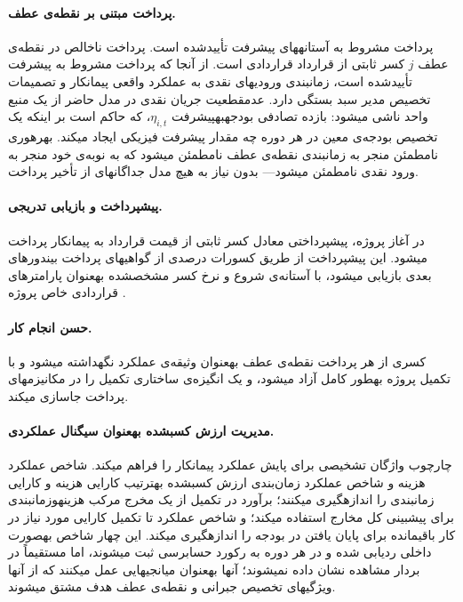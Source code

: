 \paragraph{پرداخت مبتنی بر نقطه‌ی عطف.}
پرداخت مشروط به آستانه\zwnj{}های پیشرفت تأییدشده است.
پرداخت ناخالص در نقطه‌ی عطف $j$ کسر ثابتی از
قرارداد قراردادی است.
از آنجا که پرداخت مشروط به پیشرفت تأییدشده است،
زمان\zwnj{}بندی ورودی\zwnj{}های نقدی به عملکرد واقعی پیمانکار و
تصمیمات تخصیص مدیر سبد بستگی دارد.
عدم\zwnj{}قطعیت جریان نقدی در مدل حاضر از یک منبع واحد ناشی می\zwnj{}شود:
بازده تصادفی بودجه\zwnj{}به\zwnj{}پیشرفت $\eta_{i,t}$،
که حاکم است بر اینکه یک تخصیص بودجه‌ی معین در هر دوره
چه مقدار پیشرفت فیزیکی ایجاد می\zwnj{}کند.
بهره\zwnj{}وری نامطمئن منجر به زمان\zwnj{}بندی نقطه‌ی عطف نامطمئن می\zwnj{}شود
که به نوبه‌ی خود منجر به ورود نقدی نامطمئن می\zwnj{}شود---
بدون نیاز به هیچ مدل جداگانه\zwnj{}ای از تأخیر پرداخت.

\paragraph{پیش\zwnj{}پرداخت و بازیابی تدریجی.}
در آغاز پروژه، پیش\zwnj{}پرداختی معادل کسر ثابتی از قیمت قرارداد
به پیمانکار پرداخت می\zwnj{}شود.
این پیش\zwnj{}پرداخت از طریق کسورات درصدی از گواهی\zwnj{}های پرداخت
بین\zwnj{}دوره\zwnj{}ای بعدی بازیابی می\zwnj{}شود،
با آستانه‌ی شروع و نرخ کسر مشخص\zwnj{}شده به\zwnj{}عنوان
پارامترهای قراردادی خاص پروژه \citep{FIDIC2017}.

\paragraph{حسن انجام کار.}
کسری از هر پرداخت نقطه‌ی عطف به\zwnj{}عنوان وثیقه‌ی عملکرد
نگه\zwnj{}داشته می\zwnj{}شود و با تکمیل پروژه به\zwnj{}طور کامل آزاد می\zwnj{}شود،
و یک انگیزه‌ی ساختاری تکمیل را در مکانیزم\zwnj{}های پرداخت جاسازی می\zwnj{}کند.

\paragraph{مدیریت ارزش کسب\zwnj{}شده به\zwnj{}عنوان سیگنال عملکردی.}
چارچوب  \citep{Fleming2010} واژگان تشخیصی برای
پایش عملکرد پیمانکار را فراهم می\zwnj{}کند.
شاخص عملکرد هزینه و شاخص عملکرد زمان‌بندی ارزش کسب\zwnj{}شده به\zwnj{}ترتیب
کارایی هزینه و کارایی زمان\zwnj{}بندی را اندازه\zwnj{}گیری می\zwnj{}کنند؛
برآورد در تکمیل از یک مخرج مرکب هزینه\zwnj{}و\zwnj{}زمان\zwnj{}بندی
برای پیش\zwnj{}بینی کل مخارج استفاده می\zwnj{}کند؛
و شاخص عملکرد تا تکمیل کارایی مورد نیاز در کار باقی\zwnj{}مانده
برای پایان یافتن در بودجه را اندازه\zwnj{}گیری می\zwnj{}کند.
این چهار شاخص به\zwnj{}صورت داخلی ردیابی شده و در هر دوره
به رکورد حسابرسی ثبت می\zwnj{}شوند، اما مستقیماً در بردار مشاهده
نشان داده نمی\zwnj{}شوند؛ آن\zwnj{}ها به\zwnj{}عنوان میانجی\zwnj{}هایی عمل می\zwnj{}کنند
که از آن\zwnj{}ها ویژگی\zwnj{}های تخصیص جبرانی و نقطه‌ی عطف هدف
مشتق می\zwnj{}شوند.

